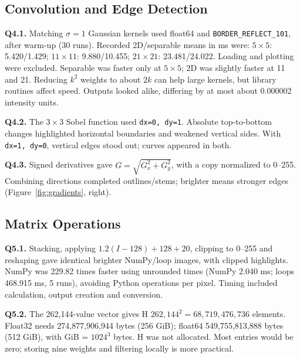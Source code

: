 \documentclass[10pt,a4paper]{article}
\begin{document}
\subsection{Convolution and Edge Detection}
\textbf{Q4.1.} Matching \(\sigma=1\) Gaussian kernels used float64 and
\texttt{BORDER\_REFLECT\_101}, after warm-up (30 runs). Recorded 2D/separable means in ms were: \(5\times5\): 5.420/1.429; \(11\times11\): 9.880/10.455; \(21\times21\): 23.481/24.022. Loading and plotting were excluded. Separable was
faster only at \(5\times5\); 2D was slightly faster at 11 and 21. Reducing
\(k^2\) weights to about \(2k\) can help large kernels, but library routines affect
speed. Outputs looked alike, differing by at most about 0.000002 intensity units.



\textbf{Q4.2.} The \(3\times3\) Sobel function used \texttt{dx=0, dy=1}.
Absolute top-to-bottom changes highlighted horizontal boundaries and weakened
vertical sides. With \texttt{dx=1, dy=0}, vertical edges stood out; curves appeared in both.

\textbf{Q4.3.} Signed derivatives gave \(G=\sqrt{G_x^2+G_y^2}\), with a copy normalized
to 0--255. Combining directions completed outlines/stems; brighter means stronger
edges (Figure~\ref{fig:gradients}, right).

\subsection{Matrix Operations}
\textbf{Q5.1.} Stacking, applying \(1.2(I-128)+128+20\), clipping to 0--255 and reshaping
gave identical brighter NumPy/loop images, with clipped highlights. NumPy was
229.82 times faster using unrounded times (NumPy 2.040 ms; loops 468.915 ms, 5 runs), avoiding Python
operations per pixel. Timing included calculation, output creation and conversion.

\textbf{Q5.2.} The 262,144-value vector gives H \(262{,}144^2=68{,}719{,}476{,}736\)
elements. Float32 needs 274,877,906,944 bytes (256 GiB); float64
549,755,813,888 bytes (512 GiB), with GiB = \(1024^3\) bytes. H was not allocated.
Most entries would be zero; storing nine weights and filtering locally is more practical.
\end{document}
